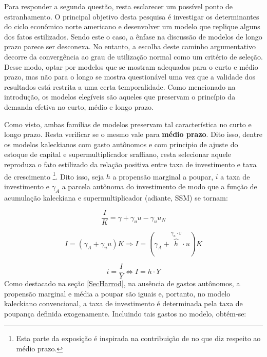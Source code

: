 Para responder a segunda questão, resta esclarecer um possível ponto de estranhamento. O principal objetivo desta pesquisa é investigar os determinantes do ciclo econômico norte americano e desenvolver um modelo que replique alguns dos fatos estilizados. Sendo este o caso, a ênfase na discussão de modelos de longo prazo parece ser desconexa. No entanto, a escolha deste caminho argumentativo decorre da convergência ao grau de utilização normal como um critério de seleção. Desse modo, optar por modelos que se mostram adequados para o curto e médio prazo, mas não para o longo se mostra questionável uma vez que a validade dos resultados está restrita a uma certa temporalidade. Como mencionado na introdução, os modelos elegíveis são aqueles que preservam o princípio da demanda efetiva no curto, médio e longo prazo.

Como visto, ambas famílias de modelos preservam tal característica no curto e longo prazo. Resta verificar se o mesmo vale para \textbf{médio prazo}. Dito isso, dentre os modelos kaleckianos com gasto autônomos e com principio de ajuste do estoque de capital e supermultiplicador sraffiano, resta selecionar aquele reproduza o fato estilizado da relação positiva entre taxa de investimento e taxa de crescimento \cites[p.~172]{cesaratto_neo-kaleckian_2015}[p.~8--9]{fiebiger_trend_2017}\footnote{Esta parte da exposição é inspirada na contribuição de \textcite{fagundes_role_2017} no que diz respeito ao médio prazo.}. Dito isso, seja $h$ a propensão marginal a poupar, $i$ a taxa de investimento e $\gamma_A$ a parcela autônoma do investimento de modo que a função de acumulação kaleckiana e supermultiplicador (adiante, SSM) se tornam:

$$
\frac{I}{K}  = \gamma + \gamma_uu - \gamma_uu_N
$$


\begin{equation}
    \tag{kaleckiana}
I = (\gamma_A + \gamma_uu)K \Rightarrow I = (\gamma_A + \overbrace{h}^{\gamma_u\cdot v}\cdot u)K
\end{equation}

\begin{equation}
    \tag{SSM}
    i = \frac{I}{Y} \Leftrightarrow I = h\cdot Y
\end{equation}
Como destacado na seção \ref{SecHarrod}, na ausência de gastos autônomos, a propensão marginal e média a poupar são iguais e, portanto, no modelo kaleckiano convencional, a taxa de investimento é determinada pela taxa de poupança definida exogenamente. Incluindo tais gastos no modelo, obtém-se:

